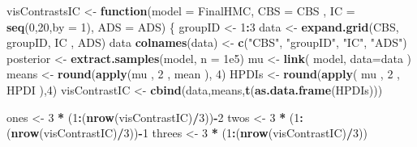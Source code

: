 \documentclass[10pt,dvipsnames,enabledeprecatedfontcommands]{scrartcl}
\newenvironment{Shaded}{\begin{snugshade}}{\end{snugshade}}
\newcommand{\KeywordTok}[1]{\textcolor[rgb]{0.13,0.29,0.53}{\textbf{#1}}}
\newcommand{\DataTypeTok}[1]{\textcolor[rgb]{0.13,0.29,0.53}{#1}}
\newcommand{\DecValTok}[1]{\textcolor[rgb]{0.00,0.00,0.81}{#1}}
\newcommand{\FloatTok}[1]{\textcolor[rgb]{0.00,0.00,0.81}{#1}}
\newcommand{\StringTok}[1]{\textcolor[rgb]{0.31,0.60,0.02}{#1}}
\newcommand{\ControlFlowTok}[1]{\textcolor[rgb]{0.13,0.29,0.53}{\textbf{#1}}}
\newcommand{\OperatorTok}[1]{\textcolor[rgb]{0.81,0.36,0.00}{\textbf{#1}}}
\newcommand{\NormalTok}[1]{#1}
\begin{document}
\begin{Shaded}
\begin{Highlighting}[]
\NormalTok{visContrastsIC <-}\StringTok{ }\ControlFlowTok{function}\NormalTok{(}\DataTypeTok{model =}\NormalTok{ FinalHMC, }\DataTypeTok{CBS =}\NormalTok{ CBS ,}
                           \DataTypeTok{IC =}  \KeywordTok{seq}\NormalTok{(}\DecValTok{0}\NormalTok{,}\DecValTok{20}\NormalTok{,}\DataTypeTok{by =} \DecValTok{1}\NormalTok{), }\DataTypeTok{ADS =}\NormalTok{ ADS)}
\NormalTok{\{}
\NormalTok{  groupID <-}\StringTok{ }\DecValTok{1}\OperatorTok{:}\DecValTok{3}
\NormalTok{  data <-}\StringTok{ }\KeywordTok{expand.grid}\NormalTok{(CBS, groupID, IC , ADS)}
\NormalTok{  data}
  \KeywordTok{colnames}\NormalTok{(data) <-}\StringTok{ }\KeywordTok{c}\NormalTok{(}\StringTok{"CBS"}\NormalTok{, }\StringTok{"groupID"}\NormalTok{, }\StringTok{"IC"}\NormalTok{, }\StringTok{"ADS"}\NormalTok{)}
\NormalTok{  posterior <-}\StringTok{ }\KeywordTok{extract.samples}\NormalTok{(model, }\DataTypeTok{n =} \FloatTok{1e5}\NormalTok{)}
\NormalTok{  mu <-}\StringTok{ }\KeywordTok{link}\NormalTok{( model, }\DataTypeTok{data=}\NormalTok{data ) }
\NormalTok{  means <-}\StringTok{  }\KeywordTok{round}\NormalTok{(}\KeywordTok{apply}\NormalTok{(mu , }\DecValTok{2}\NormalTok{ , mean ), }\DecValTok{4}\NormalTok{)}
\NormalTok{  HPDIs <-}\StringTok{ }\KeywordTok{round}\NormalTok{(}\KeywordTok{apply}\NormalTok{( mu , }\DecValTok{2}\NormalTok{ , HPDI ),}\DecValTok{4}\NormalTok{)}
\NormalTok{  visContrastIC <-}\StringTok{ }\KeywordTok{cbind}\NormalTok{(data,means,}\KeywordTok{t}\NormalTok{(}\KeywordTok{as.data.frame}\NormalTok{(HPDIs)))}
  
\NormalTok{  ones <-}\StringTok{ }\DecValTok{3} \OperatorTok{*}\StringTok{ }\NormalTok{(}\DecValTok{1}\OperatorTok{:}\NormalTok{(}\KeywordTok{nrow}\NormalTok{(visContrastIC)}\OperatorTok{/}\DecValTok{3}\NormalTok{))}\OperatorTok{-}\DecValTok{2}
\NormalTok{  twos <-}\StringTok{ }\DecValTok{3} \OperatorTok{*}\StringTok{ }\NormalTok{(}\DecValTok{1}\OperatorTok{:}\NormalTok{(}\KeywordTok{nrow}\NormalTok{(visContrastIC)}\OperatorTok{/}\DecValTok{3}\NormalTok{))}\OperatorTok{-}\DecValTok{1}
\NormalTok{  threes <-}\StringTok{ }\DecValTok{3} \OperatorTok{*}\StringTok{ }\NormalTok{(}\DecValTok{1}\OperatorTok{:}\NormalTok{(}\KeywordTok{nrow}\NormalTok{(visContrastIC)}\OperatorTok{/}\DecValTok{3}\NormalTok{))}
  

\end{Highlighting}
\end{Shaded}
\end{document}

